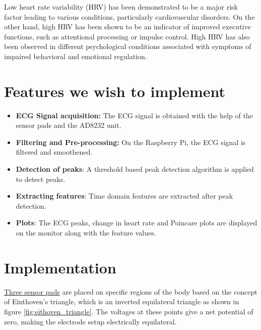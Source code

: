 \documentclass[11pt]{article}
\theoremstyle{definition}
\begin{document}
  Low heart rate variability (HRV) has been demonstrated to be a major risk factor leading to various conditions, particularly cardiovascular disorders\cite{kamath1987heart}.
  On the other hand, high HRV has been shown to be an indicator of improved executive functions, such as attentional processing or impulse control\cite{appelhans2006heart, thayer2005psychosomatics}.
  High HRV has also been observed in different psychological conditions associated with symptoms of impaired behavioral and emotional regulation\cite{thayer2009claude, schulz2008negative}.


  \section{Features we wish to implement}
  \begin{itemize}
    \item \textbf{ECG Signal acquisition:} The ECG signal is obtained with the help of the sensor pads and the AD8232 unit.
    \item \textbf{Filtering and Pre-processing:} On the Raspberry Pi, the ECG signal is filtered and smoothened.
    \item \textbf{Detection of peaks}: A threshold based peak detection algorithm is applied to detect peaks.
    \item \textbf{Extracting features}: Time domain features are extracted after peak detection.
    \item \textbf{Plots}: The ECG peaks, change in heart rate and Poincare plots are displayed on the monitor along with the feature values.
  \end{itemize}


  \section{Implementation}
  \underline{Three sensor pads} are placed on specific regions of the body based on the concept of Einthoven’s triangle\cite{abi2019einthoven}, which is an inverted equilateral triangle as shown in figure \ref{fig:eithoven_triangle}. The voltages at these points give a net potential of zero, making the electrode setup electrically equilateral.
\end{document}
